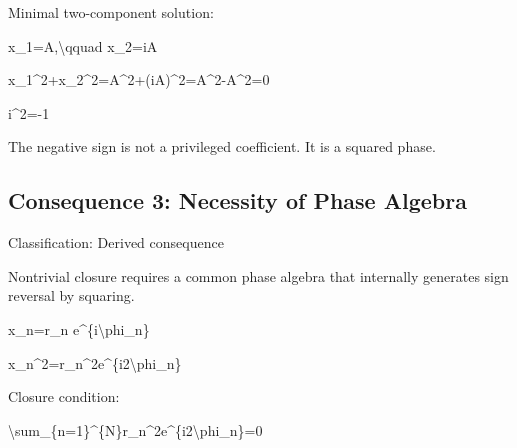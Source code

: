 \documentclass[
  a4paper]{article}
\newenvironment{Shaded}{}{}
\newcommand{\NormalTok}[1]{#1}
\begin{document}
Minimal two-component solution:

\begin{Shaded}
\begin{Highlighting}[]
\NormalTok{x\_1=A,\textbackslash{}qquad x\_2=iA}
\end{Highlighting}
\end{Shaded}

\begin{Shaded}
\begin{Highlighting}[]
\NormalTok{x\_1\^{}2+x\_2\^{}2=A\^{}2+(iA)\^{}2=A\^{}2{-}A\^{}2=0}
\end{Highlighting}
\end{Shaded}

\begin{Shaded}
\begin{Highlighting}[]
\NormalTok{i\^{}2={-}1}
\end{Highlighting}
\end{Shaded}

The negative sign is not a privileged coefficient. It is a squared
phase.

\subsection{Consequence 3: Necessity of Phase
Algebra}\label{consequence-3-necessity-of-phase-algebra}

Classification: Derived consequence

Nontrivial closure requires a common phase algebra that internally
generates sign reversal by squaring.

\begin{Shaded}
\begin{Highlighting}[]
\NormalTok{x\_n=r\_n e\^{}\{i\textbackslash{}phi\_n\}}
\end{Highlighting}
\end{Shaded}

\begin{Shaded}
\begin{Highlighting}[]
\NormalTok{x\_n\^{}2=r\_n\^{}2e\^{}\{i2\textbackslash{}phi\_n\}}
\end{Highlighting}
\end{Shaded}

Closure condition:

\begin{Shaded}
\begin{Highlighting}[]
\NormalTok{\textbackslash{}sum\_\{n=1\}\^{}\{N\}r\_n\^{}2e\^{}\{i2\textbackslash{}phi\_n\}=0}
\end{Highlighting}
\end{Shaded}
\end{document}
